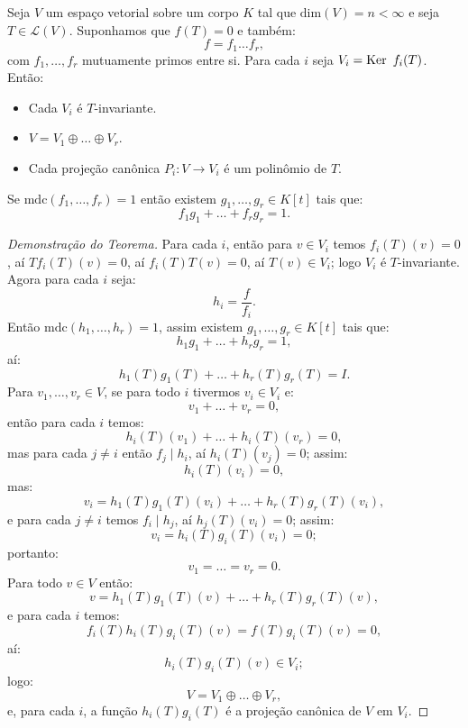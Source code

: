 \documentclass[11pt,twoside,a4paper]{book}
\begin{document}
\begin{teorema}
Seja \(V\) um espaço vetorial sobre um corpo \(K\) tal que
\(\text{dim}(V)=n<\infty\) e seja \(T\in\mathcal{L}(V)\). Suponhamos que
\(f(T)=0\) e também:
\[
f=f_1\ldots f_r,
\]
com $f_1,\dots,f_r$ mutuamente primos entre si. Para cada $i$ seja $V_i=\operatorname{Ker} \ f_i(T)$. Então:
\begin{itemize}
\item Cada $V_i$ é $T$-invariante.
\item $V=V_1\oplus\dots\oplus V_r$.
\item Cada projeção canônica $P_i:V\rightarrow V_i$ é um polinômio de $T$.
\end{itemize}
\end{teorema}
\begin{lema}
Se \(\mathrm{mdc}(f_1,\dots,f_r)=1\) então existem $g_1,\dots,g_r\in K[t]$ tais que:
\[f_1g_1+\dots+f_rg_r=1.\]
\end{lema}
\begin{proof}[Demonstração do Teorema]
Para cada $i$, então para $v\in V_i$ temos $f_i(T)(v)=0$, aí $Tf_i(T)(v)=0$, aí $f_i(T)T(v)=0$, aí $T(v)\in V_i$; logo $V_i$ é $T$-invariante. Agora para cada $i$ seja:
\[
h_i=\frac{f}{f_i}.
\]
Então $\mathrm{mdc}(h_1,\dots,h_r)=1$, assim existem $g_1,\dots,g_r\in K[t]$ tais que:
\[h_1g_1+\dots+h_rg_r=1,\]
aí:
\[
h_1(T)g_1(T)+\dots+h_r(T)g_r(T)=I.
\]
Para $v_1,\dots,v_r\in V$, se para todo $i$ tivermos $v_i\in V_i$ e:
\[
v_1+\dots+v_r=0,
\]
então para cada $i$ temos:
\[
h_i(T)(v_1)+\dots+h_i(T)(v_r)=0,
\]
mas para cada $j\neq i$ então $f_j\mid h_i$, aí $h_i(T)(v_j)=0$; assim:
\[
h_i(T)(v_i)=0,
\]
mas:
\[
v_i=h_1(T)g_1(T)(v_i)+\dots+h_r(T)g_r(T)(v_i),
\]
e para cada $j\neq i$ temos $f_i\mid h_j$, aí $h_j(T)(v_i)=0$; assim:
\[
v_i=h_i(T)g_i(T)(v_i)=0;
\]
portanto:
\[
v_1=\dots=v_r=0.
\]
Para todo $v\in V$ então:
\[
v=h_1(T)g_1(T)(v)+\dots+h_r(T)g_r(T)(v),
\]
e para cada $i$ temos:
\[
f_i(T)h_i(T)g_i(T)(v)=f(T)g_i(T)(v)=0,
\]
aí:
\[
h_i(T)g_i(T)(v)\in V_i;
\]
logo:
\[
V=V_1\oplus\dots\oplus V_r,
\]
e, para cada $i$, a função $h_i(T)g_i(T)$ é a projeção canônica de $V$ em $V_i$.
\end{proof}
\end{document}
